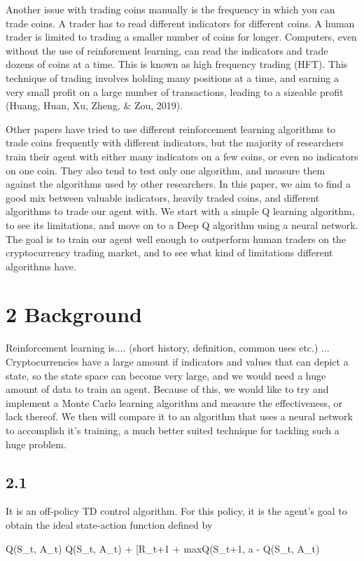 \documentclass[letterpaper]{article}
\begin{document}
Another issue with trading coins manually is the frequency in which you can trade coins. A trader has to read different indicators for different coins. A human trader is limited to trading a smaller number of coins for longer. Computers, even without the use of reinforcment learning, can read the indicators and trade dozens of coins at a time. This is known as high frequency trading (HFT). This technique of trading involves holding many positions at a time, and earning a very small profit on a large number of transactions, leading to a sizeable profit (Huang, Huan, Xu, Zheng, \& Zou, 2019).

Other papers have tried to use different reinforcement learning algorithms to trade coins frequently with different indicators, but the majority of researchers train their agent with either many indicators on a few coins, or even no indicators on one coin. They also tend to test only one algorithm, and measure them against the algorithms used by other researchers. In this paper, we aim to find a good mix between valuable indicators, heavily traded coins, and different algorithms to trade our agent with. We start with a simple Q learning algorithm, to see its limitations, and move on to a Deep Q algorithm using a neural network. The goal is to train our agent well enough to outperform human traders on the cryptocurrency trading market, and to see what kind of limitations different algorithms have.

\section{2 Background}
Reinforcement learning is.... (short history, definition, common uses etc.)
... Cryptocurrencies have a large amount if indicators and values that can depict a state, so the state space can become very large, and we would need a huge amount of data to train an agent. Because of this, we would like to try and implement a Monte Carlo learning algorithm and measure the effectiveness, or lack thereof. We then will compare it to an algorithm that uses a neural network to accomplish it's training, a much better suited technique for tackling such a huge problem.
\subsection{2.1}
It is an off-policy TD control algorithm. For this policy, it is the agent's goal to obtain the ideal state-action function defined by

Q(S_{t}, A_{t}) \leftarrow Q(S_{t}, A_{t}) + \alpha[R_{t+1} + \gamma maxQ(S_{t+1, a} - Q(S_{t}, A_{t})
	
\end{document}
